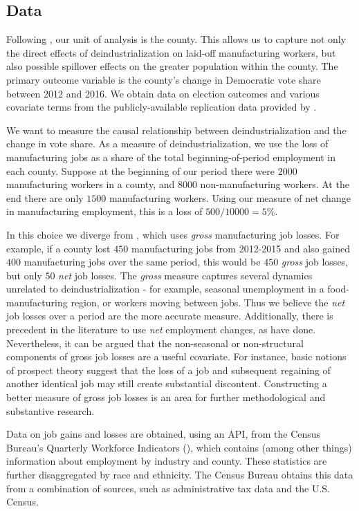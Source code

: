 \documentclass[]{AEA}
\begin{document}
\subsection{Data} 
\label{datasec}

Following \cite{Baccini21}, our unit of analysis is the county. This
allows us to capture not only the direct effects of deindustrialization
on laid-off manufacturing workers, but also possible spillover effects
on the greater population within the county. The primary outcome
variable is the county's change in Democratic vote share between 2012
and 2016. We obtain data on election outcomes and various covariate
terms from the publicly-available replication data provided by
\cite{Baccini21}.

We want to measure the causal relationship between deindustrialization
and the change in vote share. As a measure of deindustrialization, we
use the loss of manufacturing jobs as a share of the total
beginning-of-period employment in each county. Suppose at the beginning
of our period there were \(2000\) manufacturing workers in a county, and
\(8000\) non-manufacturing workers. At the end there are only \(1500\)
manufacturing workers. Using our measure of net change in manufacturing
employment, this is a loss of \(500/10000 = 5\%.\)

In this choice we diverge from \cite{Baccini21}, which uses \emph{gross}
manufacturing job losses. For example, if a county lost \(450\)
manufacturing jobs from 2012-2015 and also gained \(400\) manufacturing
jobs over the same period, this would be \(450\) \emph{gross} job
losses, but only \(50\) \emph{net} job losses. The \emph{gross} measure
captures several dynamics unrelated to deindustrialization - for
example, seasonal unemployment in a food-manufacturing region, or
workers moving between jobs. Thus we believe the \emph{net} job losses
over a period are the more accurate measure. Additionally, there is
precedent in the literature to use \emph{net} employment changes, as
\cite{Autor21} have done. Nevertheless, it can be argued that the
non-seasonal or non-structural components of gross job losses are a
useful covariate. For instance, basic notions of prospect theory suggest
that the loss of a job and subsequent regaining of another identical job
may still create substantial discontent. Constructing a better measure
of gross job losses is an area for further methodological and
substantive research.

Data on job gains and losses are obtained, using an API, from the Census
Bureau's Quarterly Workforce Indicators (\cite{QWI}), which contains
(among other things) information about employment by industry and
county. These statistics are further disaggregated by race and
ethnicity. The Census Bureau obtains this data from a combination of
sources, such as administrative tax data and the U.S. Census.
\end{document}
